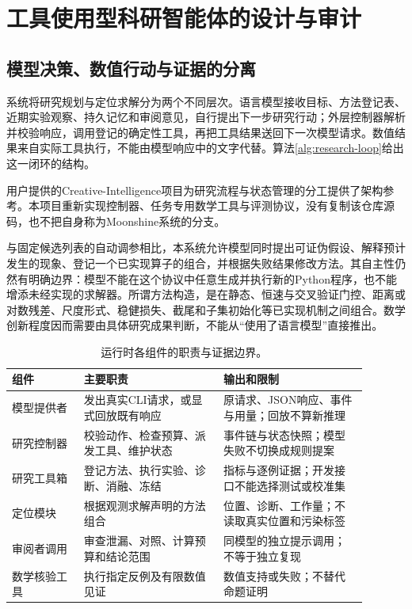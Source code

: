 \section{工具使用型科研智能体的设计与审计}
\label{sec:agent-system}

\subsection{模型决策、数值行动与证据的分离}

系统将研究规划与定位求解分为两个不同层次。语言模型接收目标、方法登记表、近期实验观察、持久记忆和审阅意见，自行提出下一步研究行动；外层控制器解析并校验响应，调用登记的确定性工具，再把工具结果送回下一次模型请求。数值结果来自实际工具执行，不能由模型响应中的文字代替。算法\ref{alg:research-loop}给出这一闭环的结构。

用户提供的Creative-Intelligence项目\cite{creativeIntelligence}为研究流程与状态管理的分工提供了架构参考。本项目重新实现控制器、任务专用数学工具与评测协议，没有复制该仓库源码，也不把自身称为Moonshine系统的分支。

与固定候选列表的自动调参相比，本系统允许模型同时提出可证伪假设、解释预计发生的现象、登记一个已实现算子的组合，并根据失败结果修改方法。其自主性仍然有明确边界：模型不能在这个协议中任意生成并执行新的Python程序，也不能增添未经实现的求解器。所谓方法构造，是在静态、恒速与交叉验证门控、距离或对数残差、尺度形式、稳健损失、截尾和子集初始化等已实现机制之间组合。数学创新程度因而需要由具体研究成果判断，不能从“使用了语言模型”直接推出。



\begin{table}[H]
  \centering
  \small
  \caption{运行时各组件的职责与证据边界。}
  \label{tab:agent-components}
  \begin{tabular}{p{0.18\linewidth}p{0.35\linewidth}p{0.36\linewidth}}
    \toprule
    组件 & 主要职责 & 输出和限制\\
    \midrule
    模型提供者 & 发出真实CLI请求，或显式回放既有响应 & 原请求、JSON响应、事件与用量；回放不算新推理\\
    研究控制器 & 校验动作、检查预算、派发工具、维护状态 & 事件链与状态快照；模型失败不切换成规则提案\\
    研究工具箱 & 登记方法、执行实验、诊断、消融、冻结 & 指标与逐例证据；开发接口不能选择测试或校准集\\
    定位模块 & 根据观测求解声明的方法组合 & 位置、诊断、工作量；不读取真实位置和污染标签\\
    审阅者调用 & 审查泄漏、对照、计算预算和结论范围 & 同模型的独立提示调用；不等于独立复现\\
    数学核验工具 & 执行指定反例及有限数值见证 & 数值支持或失败；不替代命题证明\\
    \bottomrule
  \end{tabular}
\end{table}

